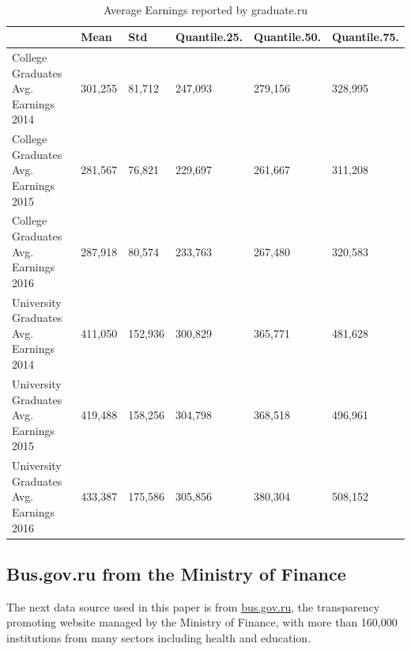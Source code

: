 \documentclass[alpha-refs]{wiley-article-05g}
\begin{document}
\begin{table}[htbp!]
    \centering
		\caption{Average Earnings reported by graduate.ru}
		\label{tab:1.1}\\
    \begin{tabular}{|l|l|l|l|l|l|}
    \hline
         & Mean & Std & Quantile.25. & Quantile.50. & Quantile.75. \\ \hline
        College Graduates Avg. Earnings 2014 & 301,255 & 81,712 & 247,093 & 279,156 & 328,995 \\ \hline
        College Graduates Avg. Earnings 2015 & 281,567 & 76,821 & 229,697 & 261,667 & 311,208 \\ \hline
        College Graduates Avg. Earnings 2016 & 287,918 & 80,574 & 233,763 & 267,480 & 320,583 \\ \hline
        University Graduates Avg. Earnings 2014 & 411,050 & 152,936 & 300,829 & 365,771 & 481,628 \\ \hline
        University Graduates Avg. Earnings 2015 & 419,488 & 158,256 & 304,798 & 368,518 & 496,961 \\ \hline
        University Graduates Avg. Earnings 2016 & 433,387 & 175,586 & 305,856 & 380,304 & 508,152 \\ \hline
    \end{tabular}
\end{table}

\vspace{-0.3in}

\subsection{Bus.gov.ru from the Ministry of Finance}

The next data source used in this paper is from \url{bus.gov.ru}, the transparency promoting website managed by the Ministry of Finance, with more than 160,000 institutions from many sectors including health and education. 

\vspace{-0.25in}
\end{document}
